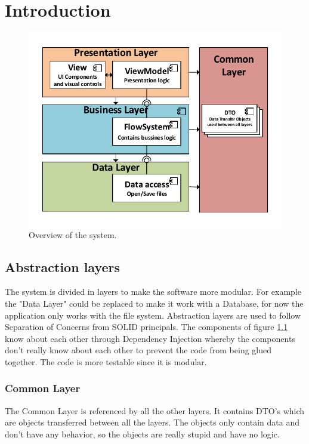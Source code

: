 \chapter{Introduction}
\begin{figure}[h!]
  \centering
    \includegraphics{figures/SystemOverview.pdf}
  \caption{Overview of the system.}
  \label{fig:systemoverview}
\end{figure}

\section{Abstraction layers}
The system is divided in layers to make the software more modular. For example the "Data Layer" could be replaced to make it work with a Database, for now the application only works with the file system. Abstraction layers are used to follow Separation of Concerns from SOLID principals. The components of figure \ref{fig:systemoverview} know about each other through Dependency Injection whereby the components don't really know about each other to prevent the code from being glued together. The code is more testable since it is modular.

\subsection{Common Layer}
The Common Layer is referenced by all the other layers. It contains DTO's which are objects transferred between all the layers. The objects only contain data and don't have any behavior, so the objects are really stupid and have no logic.

